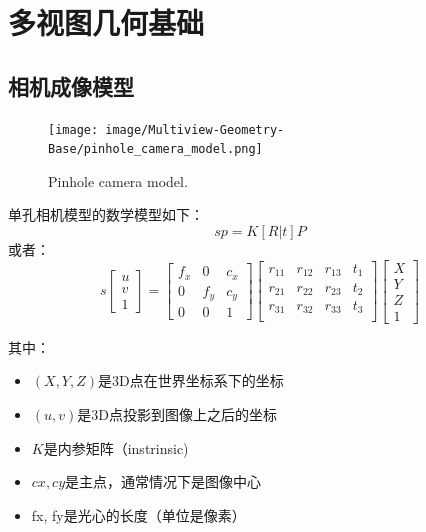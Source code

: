 
\chapter{多视图几何基础}

\section{相机成像模型}


\begin{figure}[h]%
	\centering  %
	\texttt{[image: image/Multiview-Geometry-Base/pinhole\_camera\_model.png]}  %
	\caption{Pinhole camera model.}  %
	\label{fig:pinhole_camera_model}   %
\end{figure}

单孔相机模型的数学模型如下：
\begin{equation}
	sp = K[R|t]P
\end{equation}
或者：
\begin{equation}
	s \left[\begin{array}{c}
	u \\
	v \\
	1
	\end{array}\right]
	= 
	\left[\begin{array}{ccc}
		f_x & 0 & c_x \\
		0 & f_y & c_y \\
		0 & 0 & 1
	\end{array}\right]
	\left[\begin{array}{cccc}
		r_{11} & r_{12} & r_{13} & t_1 \\
		r_{21} & r_{22} & r_{23} & t_2 \\
		r_{31} & r_{32} & r_{33} & t_3 \\
	\end{array}\right]
	\left[\begin{array}{c}
		X \\
		Y \\
		Z \\
		1
	\end{array}\right]
\end{equation}

其中：
\begin{itemize}
	\item $(X, Y, Z)$是3D点在世界坐标系下的坐标
	\item $(u, v)$是3D点投影到图像上之后的坐标
	\item $K$是内参矩阵（instrinsic)
	\item $cx, cy$是主点，通常情况下是图像中心
	\item fx, fy是光心的长度（单位是像素）
\end{itemize}

